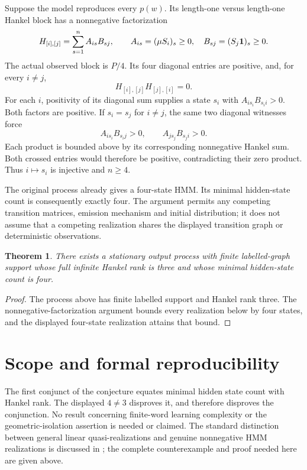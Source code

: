 \documentclass[11pt]{article}
\newtheorem{theorem}{Theorem}
\begin{document}
Suppose the model reproduces every $p(w)$. Its length-one
versus length-one Hankel block has a nonnegative factorization
\[
 H_{[i],[j]}=\sum_{s=1}^n A_{is}B_{sj},\qquad
 A_{is}=(\mu S_i)_s\geq0,\quad
 B_{sj}=(S_j{\bf1})_s\geq0.
\]
The actual observed block is $P/4$. Its four diagonal
entries are positive, and, for every $i\ne j$,
\[
                  H_{[i],[j]}H_{[j],[i]}=0.
\]
For each $i$, positivity of its diagonal sum supplies a
state $s_i$ with $A_{i s_i}B_{s_i i}>0$. Both factors
are positive. If $s_i=s_j$ for $i\ne j$, the same two
diagonal witnesses force
\[
 A_{i s_i}B_{s_i j}>0,\qquad
 A_{j s_j}B_{s_j i}>0.
\]
Each product is bounded above by its corresponding
nonnegative Hankel sum. Both crossed entries would
therefore be positive, contradicting their zero product.
Thus $i\mapsto s_i$ is injective and $n\geq4$.

The original process already gives a four-state HMM.
Its minimal hidden-state count is consequently exactly four.
The argument permits any competing transition matrices,
emission mechanism and initial distribution; it does not
assume that a competing realization shares the displayed
transition graph or deterministic observations.

\begin{theorem}
There exists a stationary output process with finite
labelled-graph support whose full infinite Hankel rank
is three and whose minimal hidden-state count is four.
\end{theorem}
\begin{proof}
The process above has finite labelled support and Hankel
rank three. The nonnegative-factorization argument bounds
every realization below by four states, and the displayed
four-state realization attains that bound.
\end{proof}

\newpage
\section*{Scope and formal reproducibility}
The first conjunct of the conjecture equates minimal hidden
state count with Hankel rank. The displayed $4\ne3$
disproves it, and therefore disproves the conjunction.
No result concerning finite-word learning complexity or
the geometric-isolation assertion is needed or claimed.
The standard distinction between general linear
quasi-realizations and genuine nonnegative HMM realizations
is discussed in \cite[Sections 1--2]{ohta}; the complete
counterexample and proof needed here are given above.
\end{document}
